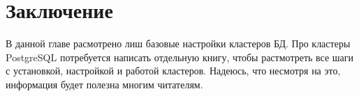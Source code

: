 \section{Заключение}
В данной главе расмотрено лиш базовые настройки кластеров БД. 
Про кластеры PostgreSQL потребуется написать отдельную книгу, чтобы растмотреть все шаги с установкой, настройкой и работой кластеров.
Надеюсь, что несмотря на это, информация будет полезна многим читателям.